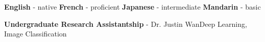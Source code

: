 \documentclass[9pt]{developercv} %
\begin{document}

	\begin{minipage}[t]{\textwidth}
		\vspace{-\baselineskip} %
	
		\textbf{English} - native \hfill
		\textbf{French} - proficient \hfill
		\textbf{Japanese} - intermediate \hfill
		\textbf{Mandarin} - basic \hfill
	\end{minipage}



	\begin{minipage}[t]{\textwidth}
		\vspace{-\baselineskip} %
		\textbf{Undergraduate Research Assistantship} - Dr. Justin Wan\slashsep Deep Learning, Image Classification
	\end{minipage}

\end{document}

